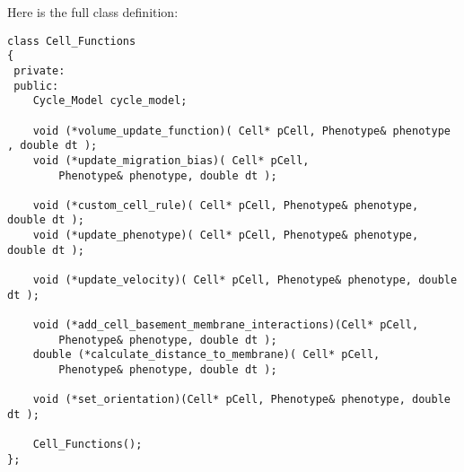 \documentclass[12pt]{article}
\begin{document}
Here is 
the full class definition: 
\begin{verbatim}
class Cell_Functions
{
 private:
 public:
    Cycle_Model cycle_model; 

    void (*volume_update_function)( Cell* pCell, Phenotype& phenotype , double dt );  
    void (*update_migration_bias)( Cell* pCell, 
        Phenotype& phenotype, double dt ); 
    
    void (*custom_cell_rule)( Cell* pCell, Phenotype& phenotype, double dt ); 
    void (*update_phenotype)( Cell* pCell, Phenotype& phenotype, double dt );  
    
    void (*update_velocity)( Cell* pCell, Phenotype& phenotype, double dt ); 
    
    void (*add_cell_basement_membrane_interactions)(Cell* pCell, 
        Phenotype& phenotype, double dt );
    double (*calculate_distance_to_membrane)( Cell* pCell, 
        Phenotype& phenotype, double dt );
    
    void (*set_orientation)(Cell* pCell, Phenotype& phenotype, double dt );
    
    Cell_Functions();  
};
\end{verbatim}
\end{document}
